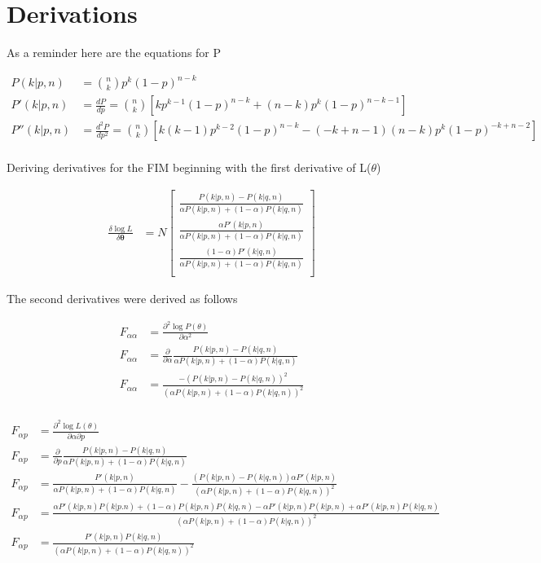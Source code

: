 \section{Derivations}

As a reminder here are the equations for P

\begin{align*}
P(k | p, n) &= \binom{n}{k}p^{k}(1 - p)^{n - k} \\
P'(k | p, n) &= \frac{dP}{dp} = \binom{n}{k}\left[kp^{k - 1}(1 - p)^{n - k} + (n - k)p^{k}(1 - p)^{n - k - 1}\right]\\
P''(k | p, n) &= \frac{d^2P}{dp^2} = \binom{n}{k}\left[k(k - 1)p^{k - 2}(1 - p)^{n - k} - (-k + n - 1)(n - k)p^k(1 - p)^{-k + n - 2} \right]\\
\end{align*}

Deriving derivatives for the FIM beginning with the first derivative of L($\theta$)

\begin{align*}
\frac{\delta \log L}{\delta \mathbf{\theta}} &= N \begin{bmatrix} 
 \frac{P(k | p, n) - P(k | q, n)}{\alpha P(k | p, n) + (1-\alpha)P(k | q, n)} \\ 
\frac{\alpha P'(k | p, n)}{\alpha P(k | p, n) + (1-\alpha)P(k | q, n)} \\ 
\frac{(1 - \alpha) P'(k | q, n)}{\alpha P(k | p, n) + (1-\alpha)P(k | q, n)} \\  \end{bmatrix}
\end{align*}

The second derivatives were derived as follows

\begin{align*}
F_{\alpha\alpha} &= \frac{\partial^2\log P(\mathbb{\theta})}{\partial\alpha^2} \\
F_{\alpha\alpha} &= \frac{\partial}{\partial\alpha}\frac{P(k | p, n) - P(k | q, n)}{\alpha P(k | p, n) + (1-\alpha)P(k | q, n)} \\
F_{\alpha\alpha} &= \frac{-(P(k | p, n) - P(k | q, n))^2}{(\alpha P(k | p, n) + (1 - \alpha) P(k | q, n))^2} \\
\end{align*}

\begin{align*}
F_{\alpha p} &= \frac{\partial^2\log L(\mathbb{\theta})}{\partial\alpha\partial p} \\
F_{\alpha p} &= \frac{\partial}{\partial p}\frac{P(k | p, n) - P(k | q, n)}{\alpha P(k | p, n) + (1-\alpha)P(k | q, n)} \\
F_{\alpha p} &= \frac{P'(k | p, n)}{\alpha P(k | p, n) + (1-\alpha)P(k | q, n)} - \frac{(P(k | p, n) - P(k | q, n))\alpha P'(k | p, n)}{(\alpha P(k | p, n) + (1 - \alpha) P(k | q, n))^2} \\
F_{\alpha p} &= \frac{\alpha P'(k | p, n)P(k | p. n) + (1 - \alpha)P(k | p, n)P(k | q, n) - \alpha P'(k | p, n)P(k | p, n) + \alpha P'(k | p, n)P(k | q, n)}{(\alpha P(k | p, n) + (1 - \alpha) P(k | q, n))^2} \\
F_{\alpha p} &= \frac{P'(k | p, n)P(k | q, n)}{(\alpha P(k | p, n) + (1 - \alpha) P(k | q, n))^2}
\end{align*}

